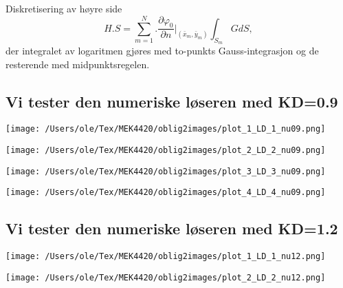 Diskretisering av høyre side
\begin{equation}
	H.S =   \sum_{m=1}^{N} \Big. \frac{\partial \varphi_0}{\partial n} \Big|_{( \bar{x}_{m} , \bar{y}_{m})} \int_{S_m}  G dS,
\end{equation}
der integralet av logaritmen gjøres med to-punkts Gauss-integrasjon og de resterende med midpunktsregelen.

\subsection{Vi tester den numeriske løseren med KD=0.9}
\noindent
\begin{minipage}[t]{0.45\linewidth}
    \texttt{[image: /Users/ole/Tex/MEK4420/oblig2images/plot\_1\_LD\_1\_nu09.png]}
\end{minipage}
\hspace{0.05\linewidth}
\begin{minipage}[t]{0.45\linewidth}
    \texttt{[image: /Users/ole/Tex/MEK4420/oblig2images/plot\_2\_LD\_2\_nu09.png]}
\end{minipage}

\vspace{0.5cm} %

\noindent
\begin{minipage}[t]{0.45\linewidth}
    \texttt{[image: /Users/ole/Tex/MEK4420/oblig2images/plot\_3\_LD\_3\_nu09.png]}
\end{minipage}
\hspace{0.05\linewidth}
\begin{minipage}[t]{0.45\linewidth}
    \texttt{[image: /Users/ole/Tex/MEK4420/oblig2images/plot\_4\_LD\_4\_nu09.png]}
\end{minipage}

\subsection{Vi tester den numeriske løseren med KD=1.2}
\noindent
\begin{minipage}[t]{0.45\linewidth}
    \texttt{[image: /Users/ole/Tex/MEK4420/oblig2images/plot\_1\_LD\_1\_nu12.png]}
\end{minipage}
\hspace{0.05\linewidth}
\begin{minipage}[t]{0.45\linewidth}
    \texttt{[image: /Users/ole/Tex/MEK4420/oblig2images/plot\_2\_LD\_2\_nu12.png]}
\end{minipage}

